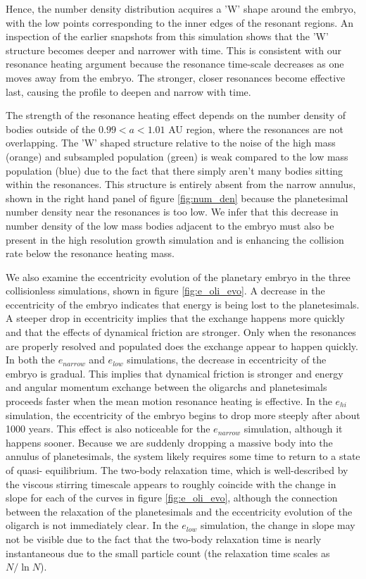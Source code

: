 Hence, the number density distribution acquires a 'W' shape around the embryo, with the low points corresponding to the inner 
edges of the resonant regions. An inspection of the earlier snapshots from this simulation shows that the 'W' structure becomes 
deeper and narrower with time. This is consistent with our resonance heating argument because the resonance time-scale 
decreases as one moves away from the embryo. The stronger, closer resonances become effective last, causing the profile to 
deepen and narrow with time.

The strength of the resonance heating effect depends on the number density of bodies outside of the $0.99 < a < 1.01$ AU 
region, where the resonances are not overlapping. The 'W' shaped structure relative to the noise of the high mass (orange) and 
subsampled population (green) is weak compared to the low mass population (blue) due to the fact that there simply aren't many 
bodies sitting within the resonances. This structure is entirely absent from the narrow annulus, shown in the right hand panel of 
figure \ref{fig:num_den} because the planetesimal number density near the resonances is too low. We infer that this decrease in 
number density of the low mass bodies adjacent to the embryo must also be present in the high resolution growth simulation and 
is enhancing the collision rate below the resonance heating mass.

We also examine the eccentricity evolution of the planetary embryo in the three collisionless simulations, shown in figure 
\ref{fig:e_oli_evo}. A decrease in the eccentricity of the embryo indicates that energy is being lost to the planetesimals. A steeper 
drop in eccentricity implies that the exchange happens more quickly and that the effects of dynamical friction are stronger. Only 
when the resonances are properly resolved and populated does the exchange appear to happen quickly. In both the $e_{narrow}
$ and $e_{low}$ simulations, the decrease in eccentricity of the embryo is gradual. This implies that dynamical friction is stronger 
and energy and angular momentum exchange between the oligarchs and planetesimals proceeds faster when the mean motion 
resonance heating is effective. In the $e_{hi}$ simulation, the eccentricity of the embryo begins to drop more steeply after about 
1000 years. This effect is also noticeable for the $e_{narrow}$ simulation, although it happens sooner. Because we are suddenly 
dropping a massive body into the annulus of planetesimals, the system likely requires some time to return to a state of quasi-
equilibrium. The two-body relaxation time, which is well-described by the viscous stirring timescale \cite{ida93} appears to 
roughly coincide with the change in slope for each of the curves in figure \ref{fig:e_oli_evo}, although the connection between the 
relaxation of the planetesimals and the eccentricity evolution of the oligarch is not immediately clear. In the $e_{low}$ simulation, 
the change in slope may not be visible due to the fact that the two-body relaxation time is nearly instantaneous due to the small particle count (the relaxation time scales as $N / \ln N$).

